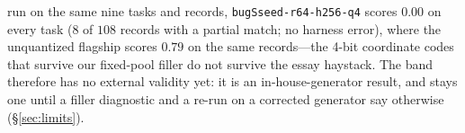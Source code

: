 \documentclass[11pt]{article}
\begin{document}
run on the same nine tasks and records, \texttt{bugSseed-r64-h256-q4} scores $0.00$
on every task ($8$ of $108$ records with a partial match; no harness error), where
the unquantized flagship scores $0.79$ on the same records---the 4-bit coordinate
codes that survive our fixed-pool filler do not survive the essay haystack. The
band therefore has no external validity yet: it is an in-house-generator result,
and stays one until a filler diagnostic and a re-run on a corrected generator say
otherwise (\S\ref{sec:limits}).
\end{document}
